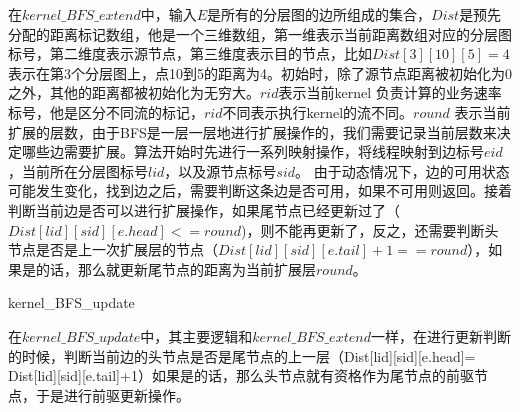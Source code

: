 在$kernel\_BFS\_extend$中，输入$E$是所有的分层图的边所组成的集合，$Dist$是预先分配的距离标记数组，他是一个三维数组，第一维表示当前距离数组对应的分层图标号，第二维度表示源节点，第三维度表示目的节点，比如$Dist[3][10][5]=4$表示在第3个分层图上，点10到5的距离为4。初始时，除了源节点距离被初始化为0之外，其他的距离都被初始化为无穷大。$rid$表示当前kernel 负责计算的业务速率标号，他是区分不同流的标记，$rid$不同表示执行kernel的流不同。$round$ 表示当前扩展的层数，由于BFS是一层一层地进行扩展操作的，我们需要记录当前层数来决定哪些边需要扩展。算法开始时先进行一系列映射操作，将线程映射到边标号$eid$，当前所在分层图标号$lid$，以及源节点标号$sid$。 由于动态情况下，边的可用状态可能发生变化，找到边之后，需要判断这条边是否可用，如果不可用则返回。接着判断当前边是否可以进行扩展操作，如果尾节点已经更新过了（$Dist[lid][sid][e.head]<=round$)，则不能再更新了，反之，还需要判断头节点是否是上一次扩展层的节点（$Dist[lid][sid][e.tail]+1==round$），如果是的话，那么就更新尾节点的距离为当前扩展层$round$。
\begin{algorithm}[t]
\begin{algorithmic}[1]
\EndIf
{}
\EndIf
\EndFunction
\end{algorithmic}
\caption{kernel\_BFS\_update}
\label{KernelBFS}
\end{algorithm}

在$kernel\_BFS\_update$中，其主要逻辑和$kernel\_BFS\_extend$一样，在进行更新判断的时候，判断当前边的头节点是否是尾节点的上一层（Dist[lid][sid][e.head]= Dist[lid][sid][e.tail]+1）如果是的话，那么头节点就有资格作为尾节点的前驱节点，于是进行前驱更新操作。

